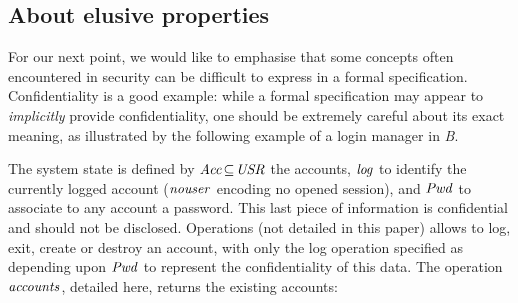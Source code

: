 \documentclass[conference]{IEEEtran}
\begin{document}
\subsection{About elusive properties}\label{elusive_prop}

For our next point, we would like to emphasise that some concepts often encountered in
security can be difficult to express in a formal specification. Confidentiality is a good
example: while a formal specification may appear to \emph{implicitly} provide confidentiality,
one should be extremely careful about its exact meaning, as illustrated by the following
example of a login manager in \emph{B}.

The system state is defined by {\small$\textrm{\emph{Acc}}\!\subseteq\!\textrm{\emph{USR}}$} the accounts,
{\small$\textrm{\emph{log}}$} to identify the currently logged account ({\small$\textrm{\emph{nouser}}$} encoding
no opened session), and {\small$\textrm{\emph{Pwd}}$} to associate to any account a password. This last
piece of information is confidential and should not be disclosed. Operations (not detailed in
this paper) allows to log, exit, create or destroy an account, with only the log operation
specified as depending upon {\small$\textrm{\emph{Pwd}}$} to represent the confidentiality of this data.
The operation {\small$\textrm{\emph{accounts}}$}, detailed here, returns the existing accounts:
\end{document}
